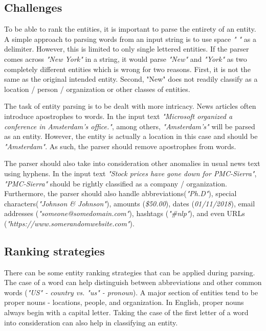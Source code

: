 \documentclass{article}
\begin{document}
		\subsection{Challenges}
		To be able to rank the entities, it is important to parse the entirety of an entity. A simple approach to parsing words from an input string is to use space \textit{" "} as a delimiter. However, this is limited to only single lettered entities. If the parser comes across \textit{"New York"} in a string, it would parse \textit{"New"} and \textit{"York"} as two completely different entities which is wrong for two reasons. First, it is not the same as the original intended entity. Second, "New" does not readily classify as a location / person / organization or other classes of entities.\
		
		The task of entity parsing is to be dealt with more intricacy. News articles often introduce apostrophes to words. In the input text \textit{"Microsoft organized a conference in Amsterdam's office."}, among others, \textit{"Amsterdam's"} will be parsed as an entity. However, the entity is actually a location in this case and should be \textit{"Amsterdam"}. As such, the parser should remove apostrophes from words.\
		
		The parser should also take into consideration other anomalies in usual news text using hyphens. In the input text \textit{"Stock prices have gone down for PMC-Sierra"}, \textit{"PMC-Sierra"} should be rightly classified as a company / organization. Furthermore, the parser should also handle abbreviations(\textit{"Ph.D"}), special characters(\textit{"Johnson \& Johnson"}), amounts (\textit{\$50.00}), dates (\textit{01/11/2018}), email addresses (\textit{"someone@somedomain.com"}), hashtags (\textit{"\#nlp"}), and even URLs (\textit{"https://www.somerandomwebsite.com"}).

		\subsection{Ranking strategies} 
		There can be some entity ranking strategies that can be applied during parsing. The case of a word can help distinguish between abbreviations and other common words (\textit{"US" - country vs. "us" - pronoun}). A major section of entities tend to be proper nouns - locations, people, and organization. In English, proper nouns always begin with a capital letter. Taking the case of the first letter of a word into consideration can also help in classifying an entity.\
		
\end{document}
